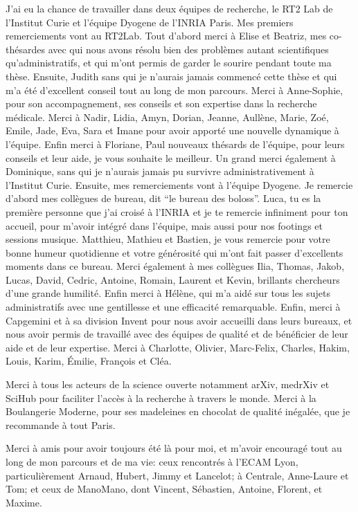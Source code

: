 J'ai eu la chance de travailler dans deux équipes de recherche, le RT2 Lab de
l'Institut Curie et l'équipe Dyogene de l'INRIA Paris. Mes premiers
remerciements vont au RT2Lab. Tout d'abord merci à Elise et Beatriz, mes
co-thésardes avec qui nous avons résolu bien des problèmes autant scientifiques
qu'administratifs, et qui m'ont permis de garder le sourire pendant toute ma
thèse. Ensuite, Judith sans qui je n'aurais jamais commencé cette thèse et qui
m'a été d'excellent conseil tout au long de mon parcours. Merci à Anne-Sophie,
pour son accompagnement, ses conseils et son expertise dans la recherche
médicale. Merci à Nadir, Lidia, Amyn, Dorian, Jeanne, Aullène, Marie, Zoé,
Emile, Jade, Eva, Sara et Imane pour avoir apporté une nouvelle dynamique à
l'équipe. Enfin merci à Floriane, Paul nouveaux thésards de l'équipe, pour leurs
conseils et leur aide, je vous souhaite le meilleur. Un grand merci également à
Dominique, sans qui je n'aurais jamais pu survivre administrativement à
l'Institut Curie. Ensuite, mes remerciements vont à l'équipe Dyogene. Je
remercie d'abord mes collègues de bureau, dit ``le bureau des boloss''. Luca, tu
es la première personne que j'ai croisé à l'INRIA et je te remercie infiniment
pour ton accueil, pour m'avoir intégré dans l'équipe, mais aussi pour nos
footings et sessions musique. Matthieu, Mathieu et Bastien, je vous remercie
pour votre bonne humeur quotidienne et votre générosité qui m'ont fait passer
d'excellents moments dans ce bureau. Merci également à mes collègues Ilia,
Thomas, Jakob, Lucas, David, Cedric, Antoine, Romain, Laurent et Kevin,
brillants chercheurs d'une grande humilité. Enfin merci à Hélène, qui m'a aidé
sur tous les sujets administratifs avec une gentillesse et une efficacité
remarquable.
Enfin, merci à Capgemini et à sa division Invent pour nous avoir accueilli dans
leurs bureaux, et nous avoir permis de travaillé avec des équipes de qualité et
de bénéficier de leur aide et de leur expertise. Merci à Charlotte, Olivier,
Marc-Felix, Charles, Hakim, Louis, Karim, Émilie, François et Cléa.

Merci à tous les acteurs de la science ouverte notamment arXiv, medrXiv et
SciHub pour faciliter l'accès à la recherche à travers le monde. Merci à la
Boulangerie Moderne, pour ses madeleines en chocolat de qualité inégalée,
que je recommande à tout Paris.

Merci à amis pour avoir toujours été là pour moi, et m'avoir encouragé tout
au long de mon parcours et de ma vie: ceux rencontrés à l'ECAM Lyon,
particulièrement Arnaud, Hubert, Jimmy et Lancelot; à Centrale, Anne-Laure et
Tom; et ceux de ManoMano, dont Vincent, Sébastien, Antoine, Florent, et Maxime.


